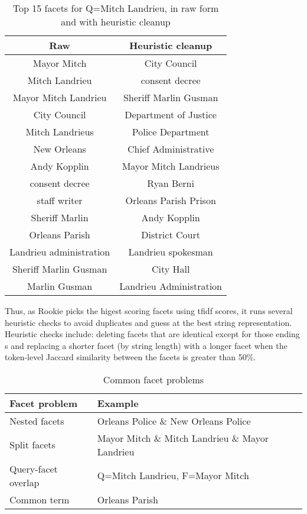 \documentclass{article}
\begin{document}
\begin{table}[h!]
\begin{center}
\begin{tabular}{ c c }
 Raw & Heuristic cleanup  \\ 
 \hline
 Mayor Mitch & City Council  \\ 
 Mitch Landrieu & consent decree \\  
 Mayor Mitch Landrieu & Sheriff Marlin Gusman \\
 City Council & Department of Justice \\
 Mitch Landrieus & Police Department \\   
 New Orleans & Chief Administrative \\   
 Andy Kopplin & Mayor Mitch Landrieus \\
 consent decree & Ryan Berni \\    
 staff writer & Orleans Parish Prison \\   
 Sheriff Marlin & Andy Kopplin \\   
 Orleans Parish & District Court \\
 Landrieu administration & Landrieu spokesman \\  
 Sheriff Marlin Gusman & City Hall \\  
 Marlin Gusman & Landrieu Administration \\   

\end{tabular}
\caption{Top 15 facets for Q=Mitch Landrieu, in raw form and with heuristic cleanup}
\end{center}
\label{t1:one}
\end{table}

Thus, as Rookie picks the higest scoring facets using tfidf scores, it runs several heuristic checks to avoid duplicates and guess at the best string representation. Heuristic checks include: deleting facets that are identical except for those ending s and replacing a shorter facet (by string length) with a longer facet when the token-level Jaccard similarity between the facets is greater than 50\%.


\begin{table}[h!]
\begin{center}
\begin{tabular}{ l l }
 Facet problem & Example \\ 
 \hline
 Nested facets & Orleans Police \& New Orleans Police  \\ 
 Split facets & Mayor Mitch \& Mitch Landrieu \& Mayor Landrieu \\  
 Query-facet overlap & Q=Mitch Landrieu, F=Mayor Mitch \\
 Common term & Orleans Parish

\end{tabular}
\caption{Common facet problems}
\end{center}
\label{t2:two}
\end{table}
\end{document}
